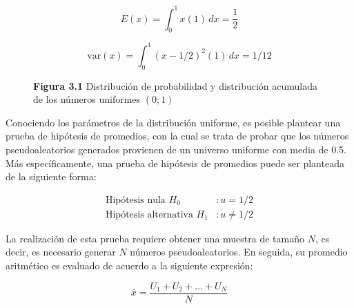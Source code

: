 \documentclass[11pt,letterpaper]{report}
\begin{document}
\begin{equation}
E(x) = \int_0^1 x(1)\,dx = \frac{1}{2}
\end{equation}

\begin{equation}
\text{var}(x) = \int_0^1 (x-1/2)^2 (1)\,dx = 1/12
\end{equation}

\begin{figure}[H]
\centering
{}
\hspace{1.5cm}
\caption*{\textbf{Figura 3.1} Distribución de probabilidad y distribución acumulada de los números uniformes $(0;1)$}
\end{figure}

Conociendo los parámetros de la distribución uniforme, es posible
plantear una prueba de hipótesis de promedios, con la cual se trata de
probar que los números pseudoaleatorios generados provienen de un
universo uniforme con media de 0.5. Más específicamente, una prueba de
hipótesis de promedios puede ser planteada de la siguiente forma:

\begin{align*}
\text{Hipótesis nula } H_0&: u = 1/2 \\
\text{Hipótesis alternativa } H_1&: u \ne 1/2
\end{align*}

La realización de esta prueba requiere obtener una muestra de tamaño
$N$, es decir, es necesario generar $N$ números pseudoaleatorios. En
seguida, su promedio aritmético es evaluado de acuerdo a la siguiente
expresión:

\begin{equation}
\bar{x} = \frac{U_1 + U_2 + \ldots + U_N}{N}
\end{equation}
\end{document}
